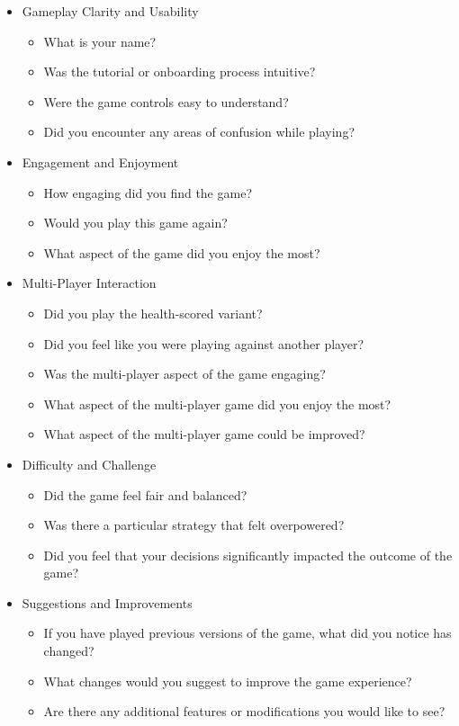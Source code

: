 \documentclass[12pt, titlepage]{article}
\begin{document}
\begin{itemize}
	\item Gameplay Clarity and Usability
	\begin{itemize}
		\item What is your name?
		\item Was the tutorial or onboarding process intuitive?
		\item Were the game controls easy to understand?
		\item Did you encounter any areas of confusion while playing?
	\end{itemize}
	
	\item Engagement and Enjoyment
	\begin{itemize}
		\item How engaging did you find the game?
		\item Would you play this game again?
		\item What aspect of the game did you enjoy the most?
	\end{itemize}
	
	\item Multi-Player Interaction
	\begin{itemize}
		\item Did you play the health-scored variant?
		\item Did you feel like you were playing against another player?
		\item Was the multi-player aspect of the game engaging?
		\item What aspect of the multi-player game did you enjoy the most?
		\item What aspect of the multi-player game could be improved?
	\end{itemize}
	
	\item Difficulty and Challenge
	\begin{itemize}
		\item Did the game feel fair and balanced?
		\item Was there a particular strategy that felt overpowered?
		\item Did you feel that your decisions significantly impacted the outcome of the game?
	\end{itemize}
	
	\item Suggestions and Improvements
	\begin{itemize}
		\item If you have played previous versions of the game, what did you notice has changed?
		\item What changes would you suggest to improve the game experience?
		\item Are there any additional features or modifications you would like to see?
	\end{itemize}
	
	
\end{itemize}
\end{document}
